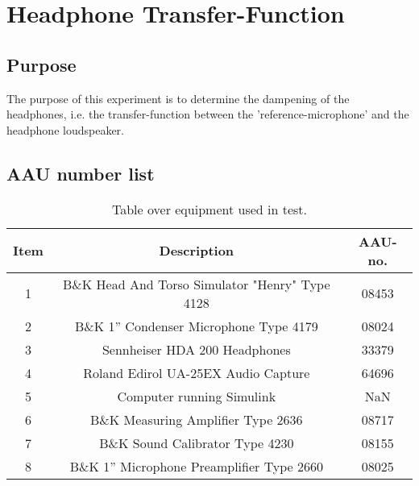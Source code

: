 \section{Headphone Transfer-Function} \label{sec:HPjournal}
\subsection{Purpose}
The purpose of this experiment is to determine the dampening of the headphones, i.e. the transfer-function between the 'reference-microphone' and the headphone loudspeaker.

\subsection{AAU number list}
\begin{table}[H]
	\centering
	\begin{tabular}{ c c c } \toprule
		{Item}	& {Description} 						& {AAU-no}. \\ \bottomrule 
		1	&	B\&K Head And Torso Simulator "Henry" Type 4128	& 08453		\\
		2	&	B\&K 1'' Condenser Microphone Type 4179 & 08024\\
		3	&	Sennheiser HDA 200	Headphones			& 33379		\\
		4	&	Roland Edirol UA-25EX Audio Capture		& 64696		\\
		5	&	Computer running Simulink\textsuperscript{\textregistered}					& NaN		\\
		6	&	B\&K Measuring Amplifier Type 2636	& 08717		\\
		7	&	B\&K Sound Calibrator Type 4230			& 08155		\\ 
		8	&	B\&K 1'' Microphone Preamplifier Type 2660	& 08025		\\
		\bottomrule
	\end{tabular}
	\caption{Table over equipment used in test.}
	\label{tab:UsedEquipmentListningHP}
\end{table}

